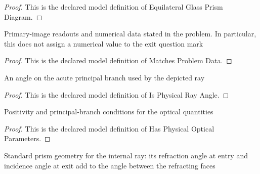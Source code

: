 \begin{proof}
  This is the declared model definition of Equilateral Glass Prism Diagram.
\end{proof}
\begin{definition}
  \label{def:physics:phyx-mini-0146:phyxminiproblems-problemphyxmini0146-matchesproblemdata}
  Primary-image readouts and numerical data stated in the problem. In particular, this does not assign a numerical value to the exit question mark
\end{definition}
\begin{proof}
  This is the declared model definition of Matches Problem Data.
\end{proof}
\begin{definition}
  \label{def:physics:phyx-mini-0146:phyxminiproblems-problemphyxmini0146-isphysicalrayangle}
  An angle on the acute principal branch used by the depicted ray
\end{definition}
\begin{proof}
  This is the declared model definition of Is Physical Ray Angle.
\end{proof}
\begin{definition}
  \label{def:physics:phyx-mini-0146:phyxminiproblems-problemphyxmini0146-hasphysicalopticalparameters}
  Positivity and principal-branch conditions for the optical quantities
\end{definition}
\begin{proof}
  This is the declared model definition of Has Physical Optical Parameters.
\end{proof}
\begin{definition}
  \label{def:physics:phyx-mini-0146:phyxminiproblems-problemphyxmini0146-satisfiesprismraygeometry}
  Standard prism geometry for the internal ray: its refraction angle at entry and incidence angle at exit add to the angle between the refracting faces
\end{definition}
